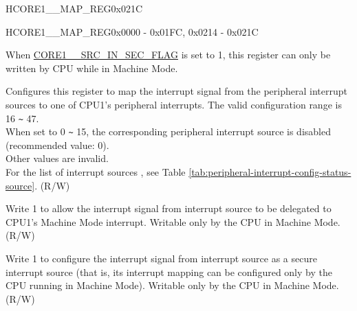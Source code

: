 \begin{register}{H}{CORE1\_\_MAP\_REG}{0x021C}\label{regdesc:CORE1AXIPERFMONINTMAPREG}
\end{register}\vspace{-3em}

\begin{register}{H}{CORE1\_\_MAP\_REG}{0x0000 - 0x01FC, 0x0214 - 0x021C}\label{regdesc:CORE1SOURCEMAPREG}
%
%
%
%
\regnewline%
\begin{regdesc}\begin{reglist}
\label{fielddesc:CORE1LPWDTINTMAP}\item [CORE1\_\regindex{SOURCE}\_MAP] When \hyperref[fielddesc:CORE1SOURCESRCINSECFLAG]{CORE1\_\_SRC\_IN\_SEC\_FLAG} is set to 1, this register can only be written by CPU while in Machine Mode.

Configures this register to map the interrupt signal from the peripheral interrupt sources  to one of CPU1’s peripheral interrupts. The valid configuration range is 16 \verb+~+ 47.\\
When set to 0 \verb+~+ 15, the corresponding peripheral interrupt source is disabled (recommended value: 0). \\

Other values are invalid. \\

For the list of interrupt sources , see Table \ref{tab:peripheral-interrupt-config-status-source}.
(R/W)

\label{fielddesc:CORE1SOURCESRCPASSINSEC}\item[CORE1\_\regindex{SOURCE}\_SRC\_PASS\_IN\_SEC] Write 1 to allow the interrupt signal from interrupt source  to be delegated to CPU1’s Machine Mode interrupt. Writable only by the CPU in Machine Mode. (R/W)

\label{fielddesc:CORE1SOURCESRCINSECFLAG}\item
[CORE1\_\regindex{SOURCE}\_SRC\_IN\_SEC\_FLAG] Write 1 to configure the interrupt signal from interrupt source  as a secure interrupt source (that is, its interrupt mapping can be configured only by the CPU running in Machine Mode). Writable only by the CPU in Machine Mode.
(R/W)

\end{reglist}\end{regdesc}
\end{register}



